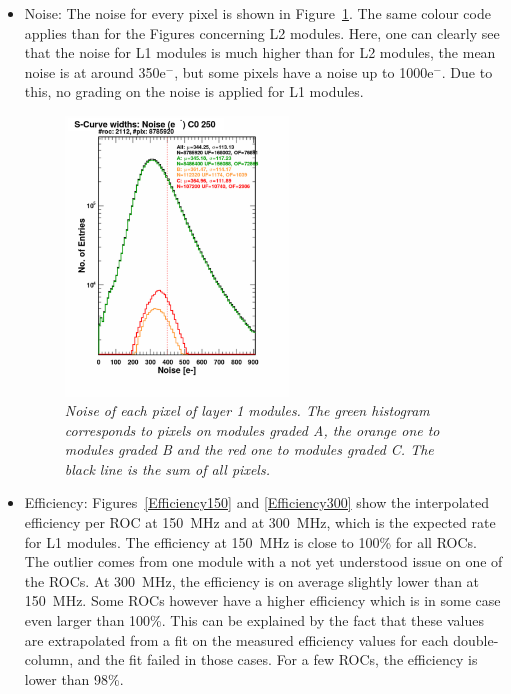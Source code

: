 \documentclass[a4paper,12pt,twoside]{article}
\begin{document}
\begin{itemize}
\item Noise:
The noise for every pixel is shown in Figure~\ref{L1Noise}. The same colour code applies than for the Figures concerning L2 modules. Here, one can clearly see that the noise for L1 modules is much higher than for L2 modules, the mean noise is at around 350e$^-$, but some pixels have a noise up to 1000e$^-$. Due to this, no grading on the noise is applied for L1 modules.

\begin{figure} [h!] \centering 
\includegraphics[width=0.56\textwidth, angle=0] {./Figures/L1Noise.pdf}
\caption{\em  \label{L1Noise}
Noise of each pixel of layer 1 modules. The green histogram corresponds to pixels on modules graded A, the orange one to modules graded B and the red one to modules graded C. The black line is the sum of all pixels.}
\end{figure}

\item Efficiency: 
Figures~\ref{Efficiency150} and \ref{Efficiency300} show the interpolated efficiency per ROC at \SI{150}{\mega\hertz} and at \SI{300}{\mega\hertz}, which is the expected rate for L1 modules. The efficiency at \SI{150}{\mega\hertz} is close to 100\% for all ROCs. The outlier comes from one module with a not yet understood issue on one of the ROCs. At \SI{300}{\mega\hertz}, the efficiency is on average slightly lower than at \SI{150}{\mega\hertz}. Some ROCs however have a higher efficiency which is in some case even larger than 100\%. This can be explained by the fact that these values are extrapolated from a fit on the measured efficiency values for each double-column, and the fit failed in those cases. For a few ROCs, the efficiency is lower than 98\%. 


\end{itemize}
\end{document}
